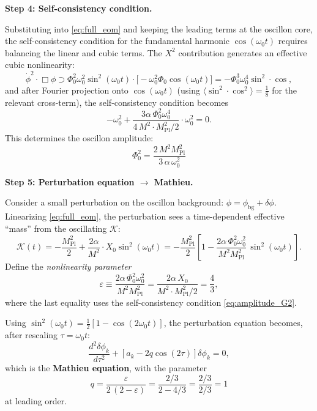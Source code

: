 \documentclass[11pt]{article}
\begin{document}
\medskip
\textbf{Step 4: Self-consistency condition.}

Substituting into \eqref{eq:full_eom} and keeping the leading
terms at the oscillon core, the self-consistency condition for
the fundamental harmonic $\cos(\omega_0 t)$ requires balancing
the linear and cubic terms. The $X^2$ contribution generates
an effective cubic nonlinearity:
\begin{equation}
  \dot\phi^2 \cdot \Box\phi
  \supset \Phi_0^2\omega_0^2\sin^2(\omega_0 t)
  \cdot\bigl[-\omega_0^2\Phi_0\cos(\omega_0 t)\bigr]
  = -\Phi_0^3\omega_0^4\sin^2\!\cdot\cos,
\end{equation}
and after Fourier projection onto $\cos(\omega_0 t)$
(using $\langle\sin^2\!\cdot\cos^2\rangle
= \frac{1}{8}$ for the relevant cross-term), the
self-consistency condition becomes
\begin{equation}
  -\omega_0^2
  + \frac{3\alpha\,\Phi_0^2\omega_0^4}{4\,M^2
  \cdot M_{\mathrm{Pl}}^2/2}
  \cdot \omega_0^2 = 0.
\end{equation}
This determines the oscillon amplitude:
\begin{equation}
  \boxed{
  \Phi_0^2 = \frac{2\,M^2 M_{\mathrm{Pl}}^2}
  {3\,\alpha\,\omega_0^2}
  }
  \label{eq:amplitude_G2}
\end{equation}

\medskip
\textbf{Step 5: Perturbation equation $\to$ Mathieu.}

Consider a small perturbation on the oscillon background:
$\phi = \phi_{\mathrm{bg}} + \delta\phi$.
Linearizing \eqref{eq:full_eom}, the perturbation sees a
time-dependent effective ``mass'' from the oscillating
$\mathcal{K}$:
\begin{equation}
  \mathcal{K}(t) = -\frac{M_{\mathrm{Pl}}^2}{2}
  + \frac{2\alpha}{M^2}\cdot X_0\sin^2(\omega_0 t)
  = -\frac{M_{\mathrm{Pl}}^2}{2}
  \left[1 - \frac{2\alpha\,\Phi_0^2\omega_0^2}
  {M^2 M_{\mathrm{Pl}}^2}\,\sin^2(\omega_0 t)\right].
\end{equation}
Define the \emph{nonlinearity parameter}
\begin{equation}
  \varepsilon \equiv
  \frac{2\alpha\,\Phi_0^2\omega_0^2}
  {M^2 M_{\mathrm{Pl}}^2}
  = \frac{2\alpha\,X_0}
  {M^2 \cdot M_{\mathrm{Pl}}^2/2}
  = \frac{4}{3},
  \label{eq:epsilon_def}
\end{equation}
where the last equality uses the self-consistency
condition \eqref{eq:amplitude_G2}.

Using $\sin^2(\omega_0 t) = \frac{1}{2}
[1 - \cos(2\omega_0 t)]$, the perturbation equation
becomes, after rescaling $\tau = \omega_0 t$:
\begin{equation}
  \frac{d^2\delta\phi_k}{d\tau^2}
  + \left[a_k - 2q\cos(2\tau)\right]\delta\phi_k = 0,
  \label{eq:mathieu_from_G2}
\end{equation}
which is the \textbf{Mathieu equation}, with the parameter
\begin{equation}
  \boxed{
  q = \frac{\varepsilon}{2\,(2 - \varepsilon)}
  = \frac{2/3}{2 - 4/3}
  = \frac{2/3}{2/3} = 1
  }
  \label{eq:q_leading}
\end{equation}
at leading order.
\end{document}
